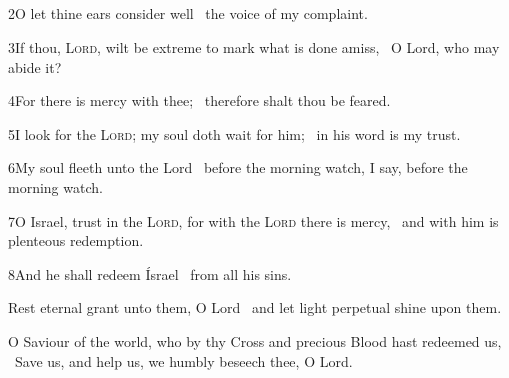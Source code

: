 \subsection[{Psalm 130}]{}


2\enspace O let thine ears consider well \star\ the voice of my complaint.

3\enspace If thou, {\scshape Lord}, wilt be extreme to mark what is done amiss, \star\ O Lord, who may abide it?

4\enspace For there is mercy with thee; \star\ therefore shalt thou be feared.

5\enspace I look for the {\scshape Lord}; my soul doth wait for him; \star\ in his word is my trust.

6\enspace My soul fleeth unto the Lord \star\ before the morning watch, I say, before the morning watch.

7\enspace O Israel, trust in the {\scshape Lord}, for with the {\scshape Lord} there is mercy, \star\ and with him is plenteous redemption.

8\enspace And he shall redeem Ísrael \star\ from all his sins.

Rest eternal grant unto them, O Lord \star\ and let light perpetual shine upon them.


 O Saviour of the world, who by thy Cross and precious Blood hast redeemed us, \star\ Save us, and help us, we humbly beseech thee, O Lord.


